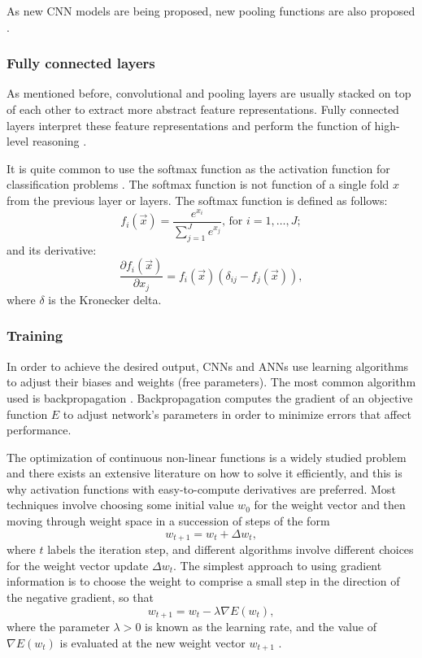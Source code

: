 As new CNN models are being proposed, new pooling functions are also
proposed \citep{Lee2015, Yu2014}.


\subsubsection{Fully connected layers}

As mentioned before, convolutional and pooling layers are usually stacked on
top of each other to extract more abstract feature representations. Fully
connected layers interpret these feature representations and perform
the function of high-level reasoning \citep{Hinton2012, Simonyan2014,
Zeiler2013}.

It is quite common to use the softmax function as the activation function
for classification problems \citep{Krizhevsky2012, Lin2013, Simonyan2014,
Zeiler2013, Szegedy2014, Xu2015}. The softmax function is not function of
a single fold $x$ from the previous layer or layers. The softmax function
is defined as follows:
$$\displaystyle f_{i}({\vec {x}})={\frac {e^{x_{i}}}{\sum _{j=1}^{J}e^{x_{j}}}}
\text{, for } i = 1, \dots, J;$$
and its derivative:
$$\displaystyle {\frac {\partial f_{i}({\vec {x}})}{\partial x_{j}}}=f_{i}
({\vec {x}})(\delta _{ij}-f_{j}({\vec {x}})),$$
where $\delta$ is the Kronecker delta.


\subsubsection{Training}

In order to achieve the desired output, CNNs and ANNs use learning
algorithms to adjust their biases and weights (free parameters). The most
common algorithm used is backpropagation \citep{LeCun1998, Bengio2009,
Deng2014, DengYu2014, LeCun1989a, Srinivas2016}. Backpropagation computes
the gradient of an objective function $E$ to adjust network’s parameters
in order to minimize errors that affect performance.

The optimization of continuous non-linear functions is a widely studied
problem and there exists an extensive literature on how to solve it
efficiently, and this is why activation functions with easy-to-compute
derivatives are preferred. Most techniques involve choosing some initial
value $w_{0}$ for the weight vector and then moving through weight space
in a succession of steps of the form
$$w_{t+1} = w_t + \Delta w_t, $$
where $t$ labels the iteration step, and different algorithms involve
different choices for the weight vector update $\Delta w_t$. The simplest
approach to using gradient information is to choose the weight to
comprise a small step in the direction of the negative gradient, so
that
$$w_{t+1} = w_t − \lambda \nabla E(w_t), $$
where the parameter $\lambda >0$ is known as the learning rate, and the
value of $\nabla E(w_t)$ is evaluated at the new weight vector $w_{t+1}$
\citep{Bishop2006}.

